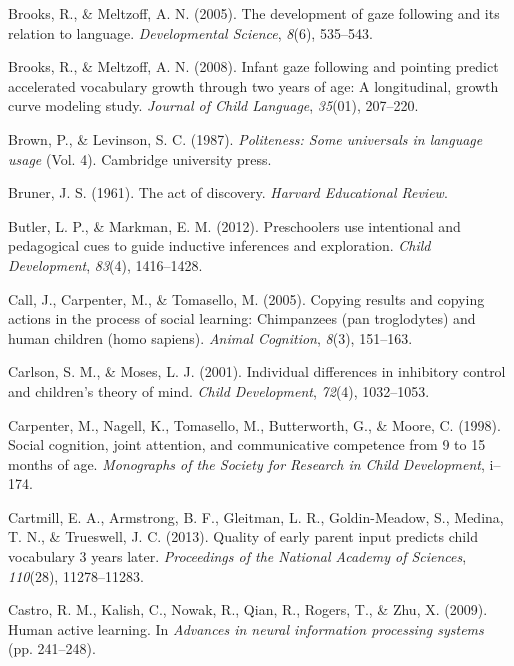 \documentclass[oneside]{report}
\begin{document}
\hypertarget{ref-brooks2005development}{}
Brooks, R., \& Meltzoff, A. N. (2005). The development of gaze following
and its relation to language. \emph{Developmental Science}, \emph{8}(6),
535--543.

\hypertarget{ref-brooks2008infant}{}
Brooks, R., \& Meltzoff, A. N. (2008). Infant gaze following and
pointing predict accelerated vocabulary growth through two years of age:
A longitudinal, growth curve modeling study. \emph{Journal of Child
Language}, \emph{35}(01), 207--220.

\hypertarget{ref-brown1987}{}
Brown, P., \& Levinson, S. C. (1987). \emph{Politeness: Some universals
in language usage} (Vol. 4). Cambridge university press.

\hypertarget{ref-bruner1961act}{}
Bruner, J. S. (1961). The act of discovery. \emph{Harvard Educational
Review}.

\hypertarget{ref-butler2012preschoolers}{}
Butler, L. P., \& Markman, E. M. (2012). Preschoolers use intentional
and pedagogical cues to guide inductive inferences and exploration.
\emph{Child Development}, \emph{83}(4), 1416--1428.

\hypertarget{ref-call2005copying}{}
Call, J., Carpenter, M., \& Tomasello, M. (2005). Copying results and
copying actions in the process of social learning: Chimpanzees (pan
troglodytes) and human children (homo sapiens). \emph{Animal Cognition},
\emph{8}(3), 151--163.

\hypertarget{ref-carlson2001individual}{}
Carlson, S. M., \& Moses, L. J. (2001). Individual differences in
inhibitory control and children's theory of mind. \emph{Child
Development}, \emph{72}(4), 1032--1053.

\hypertarget{ref-carpenter1998social}{}
Carpenter, M., Nagell, K., Tomasello, M., Butterworth, G., \& Moore, C.
(1998). Social cognition, joint attention, and communicative competence
from 9 to 15 months of age. \emph{Monographs of the Society for Research
in Child Development}, i--174.

\hypertarget{ref-cartmill2013quality}{}
Cartmill, E. A., Armstrong, B. F., Gleitman, L. R., Goldin-Meadow, S.,
Medina, T. N., \& Trueswell, J. C. (2013). Quality of early parent input
predicts child vocabulary 3 years later. \emph{Proceedings of the
National Academy of Sciences}, \emph{110}(28), 11278--11283.

\hypertarget{ref-castro2009human}{}
Castro, R. M., Kalish, C., Nowak, R., Qian, R., Rogers, T., \& Zhu, X.
(2009). Human active learning. In \emph{Advances in neural information
processing systems} (pp. 241--248).
\end{document}
